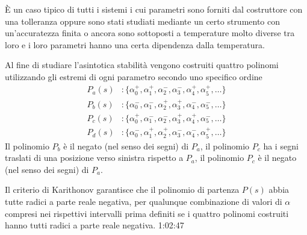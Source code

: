 È un caso tipico di tutti i sistemi i cui parametri sono forniti dal
costruttore con una tolleranza oppure sono stati studiati mediante un certo
strumento con un'accuratezza finita o ancora sono sottoposti a temperature
molto diverse tra loro e i loro parametri hanno una certa dipendenza dalla
temperatura.

Al fine di studiare l'asintotica stabilità vengono costruiti quattro polinomi
utilizzando gli estremi di ogni parametro secondo uno specifico ordine
$$
\begin{aligned}
P_a(s) &:
\{\alpha_0^+,\alpha_1^+,\alpha_2^-,\alpha_3^-,\alpha_4^+,\alpha_5^+,\ldots\}\\
P_b(s) &:
\{\alpha_0^-,\alpha_1^-,\alpha_2^+,\alpha_3^+,\alpha_4^-,\alpha_5^-,\ldots\}\\
P_c(s) &:
\{\alpha_0^+,\alpha_1^-,\alpha_2^-,\alpha_3^+,\alpha_4^+,\alpha_5^-,\ldots\}\\
P_d(s) &:
\{\alpha_0^-,\alpha_1^+,\alpha_2^+,\alpha_3^-,\alpha_4^-,\alpha_5^+,\ldots\}
\end{aligned}
$$
Il polinomio $P_b$ è il negato (nel senso dei segni) di $P_a$, il polinomio
$P_c$ ha i segni traslati di una posizione verso sinistra rispetto a $P_a$, il
polinomio $P_c$ è il negato (nel senso dei segni) di $P_a$.

Il criterio di Karithonov garantisce che il polinomio di partenza $P(s)$ abbia
tutte radici a parte reale negativa, per qualunque combinazione di valori di
$\alpha$ compresi nei rispettivi intervalli prima definiti se i quattro
polinomi costruiti hanno tutti radici a parte reale negativa. 1:02:47
